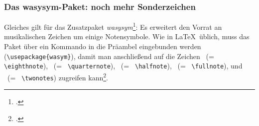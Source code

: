 %
%
%



\subsubsection{Das wasysym-Paket: noch mehr Sonderzeichen}
Gleiches gilt für das Zusatzpaket \emph{wasysym}\footcite[vgl.][\nopage
wp]{CtanWasysym2018a}: Es erweitert den Vorrat an musikalischen Zeichen um
einige Notensymbole. Wie in \LaTeX\ üblich, muss das Paket über ein Kommando in
die Präambel eingebunden werden (\texttt{\textbackslash{usepackage\{wasym\}}}),
damit man anschließend auf die Zeichen \eighthnote \ (= \texttt{\small
\textbackslash{eighthnote}}), \quarternote \ (= \texttt{\small
\textbackslash{quarternote}}), \halfnote \ (= \texttt{\small
\textbackslash{halfnote}}), \fullnote \ (= \texttt{\small
\textbackslash{fullnote}}), und \twonotes \ (= \texttt{\small
\textbackslash{twonotes}}) zugreifen kann\footcite[vgl.][2]{Kielhorn2003a}.

%
